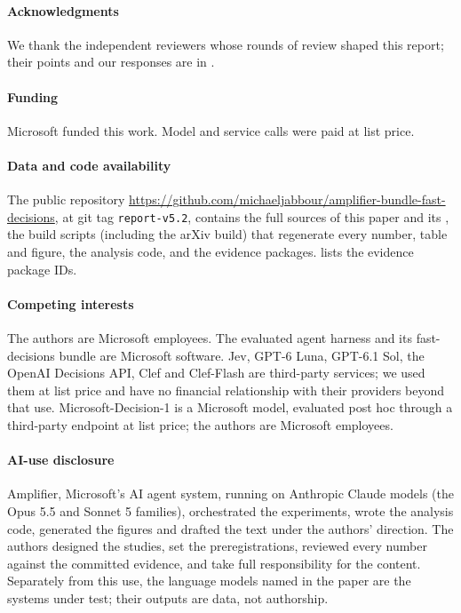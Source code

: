 \paragraph{Acknowledgments} We thank the independent reviewers whose rounds of review shaped this report; their
points and our responses are in .

\paragraph{Funding} Microsoft funded this work. Model and service calls were paid at list price.

\paragraph{Data and code availability} The public repository
\url{https://github.com/michaeljabbour/amplifier-bundle-fast-decisions}, at git tag \texttt{report-v5.2}, contains the
full sources of this paper and its \suppword{}, the build scripts (including the arXiv build) that regenerate every number,
table and figure, the analysis code, and the evidence packages.  lists the evidence package IDs.

\paragraph{Competing interests} The authors are Microsoft employees. The evaluated agent harness and its
fast-decisions bundle are Microsoft software. Jev, GPT-6 Luna, GPT-6.1 Sol, the OpenAI Decisions API, Clef and
Clef-Flash are third-party services; we used them at list price and have no financial relationship with their
providers beyond that use. Microsoft-Decision-1 is a Microsoft model, evaluated post hoc through a third-party
endpoint at list price; the authors are Microsoft employees.

\paragraph{AI-use disclosure} Amplifier, Microsoft's AI agent system, running on Anthropic Claude models (the Opus 5.5
and Sonnet 5 families), orchestrated the experiments, wrote the analysis code, generated the figures and drafted the
text under the authors' direction. The authors designed the studies, set
the preregistrations, reviewed every number against the committed evidence, and take full responsibility for the
content. Separately from this use, the language models named in the paper are the systems under test; their outputs
are data, not authorship.
